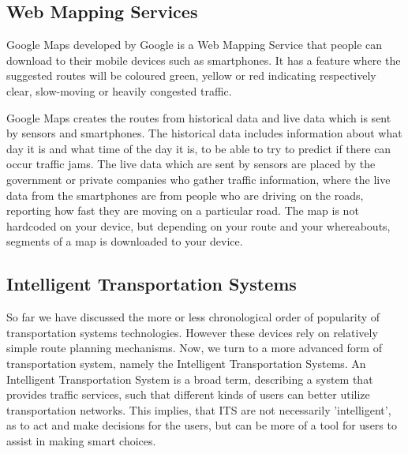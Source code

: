 \subsection*{Web Mapping Services}
%
Google Maps developed by Google is a Web Mapping Service that people can download to their mobile devices such as smartphones. It has a feature where the suggested routes will be coloured green, yellow or red indicating respectively clear, slow-moving or heavily congested traffic.

Google Maps creates the routes from historical data and live data which is sent by sensors and smartphones. The historical data includes information about what day it is and what time of the day it is, to be able to try to predict if there can occur traffic jams. The live data which are sent by sensors are placed by the government or private companies who gather traffic information, where the live data from the smartphones are from people who are driving on the roads, reporting how fast they are moving on a particular road. The map is not hardcoded on your device, but depending on your route and your whereabouts, segments of a map is downloaded to your device.

\subsection*{Intelligent Transportation Systems}
So far we have discussed the more or less chronological order of popularity of transportation systems technologies. However these devices rely on relatively simple route planning mechanisms. Now, we turn to a more advanced form of transportation system, namely the Intelligent Transportation Systems. An Intelligent Transportation System is a broad term, describing a system that provides traffic services, such that different kinds of users can better utilize transportation networks. This implies, that ITS are not necessarily 'intelligent', as to act and make decisions for the users, but can be more of a tool for users to assist in making smart choices.

